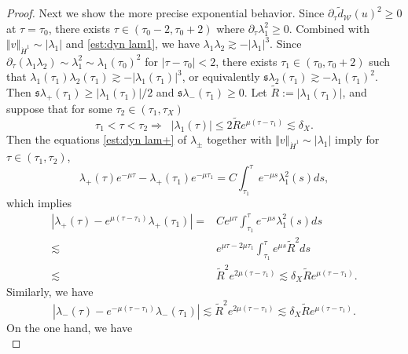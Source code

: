 \documentclass[reqno, 11pt]{amsart}
\numberwithin{equation}{section}
\theoremstyle{plain}
\theoremstyle{definition}
\numberwithin{equation}{section}
\numberwithin{theorem}{section}
\numberwithin{equation}{section}
\numberwithin{equation}{section}
\numberwithin{theorem}{section}
\begin{document}
\begin{proof}
		Next we show the more precise exponential behavior. Since $\partial_{\tau}\widetilde{d}_{\mathcal{W}}(u)^2 \geq0$ at $\tau=\tau_0$, there exists $\tau\in(\tau_0-2,\tau_0+2)$ where $\partial_{\tau}\lambda_{1}^2 \geq0$. Combined with $\Vert v \Vert_{\dot H^1}\sim |\lambda_{1}|$ and \eqref{est:dyn lam1}, we have $\lambda_{1}\lambda_{2}\gtrsim -|\lambda_{1}|^3$. Since $\partial_{\tau}(\lambda_{1}\lambda_{2})\sim \lambda_{1}^2\sim \lambda_{1}(\tau_{0})^2$ for $|\tau-\tau_{0}|<2$, there exists $\tau_{1}\in(\tau_{0},\tau_{0}+2)$ such that $\lambda_{1}(\tau_1)\lambda_{2}(\tau_1)\gtrsim -|\lambda_{1}(\tau_1)|^3$, or equivalently $\mathfrak{s}\lambda_{2}(\tau_1)\gtrsim-\lambda_{1}(\tau_{1})^2$. Then $\mathfrak{s}\lambda_+(\tau_{1})\geq |\lambda_{1}(\tau_{1})|/2$ and $\mathfrak{s}\lambda_-(\tau_{1})\geq 0$. Let $\widetilde{R}:=|\lambda_{1}(\tau_1)|$, and suppose that for some $\tau_{2}\in(\tau_{1},\tau_{X})$
		\begin{equation*}
		\tau_{1}<\tau<\tau_{2} \Longrightarrow\;\;|\lambda_{1}(\tau)|\leq 2\widetilde{R}e^{\mu(\tau-\tau_{1})} \lesssim \delta_{X}.
		\end{equation*}
		Then the equations \eqref{est:dyn lam+} of $\lambda_{\pm}$ together with $\Vert v \Vert_{\dot H^1}\sim |\lambda_{1}|$ imply for $\tau\in(\tau_1,\tau_2)$,
		\begin{equation}\label{equ:dyn elam+}
		\lambda_{+}(\tau)e^{-\mu\tau}-\lambda_{+}(\tau_1)e^{-\mu\tau_{1}}=C\int_{\tau_1}^{\tau}e^{-\mu s}\lambda_1^2(s)ds,
		\end{equation}
		which implies
		\begin{equation*}
		\begin{aligned}
		|\lambda_{+}(\tau)-e^{\mu(\tau-\tau_{1})} \lambda_{+}(\tau_{1})|=&Ce^{\mu\tau} \int_{\tau_1}^{\tau} e^{-\mu s}\lambda_1^2(s)ds\\\lesssim&e^{\mu\tau-2\mu\tau_{1}}\int_{\tau_1}^{\tau} e^{\mu s}\widetilde{R}^2ds \\\lesssim&\widetilde{R}^2 e^{2\mu(\tau-\tau_{1})} \lesssim \delta_{X}\widetilde{R}e^{\mu(\tau-\tau_{1})}.
		\end{aligned}
		\end{equation*}
		Similarly, we have
		\begin{equation*}
		|\lambda_{-}(\tau)-e^{-\mu(\tau-\tau_{1})} \lambda_{-}(\tau_{1})| \lesssim \widetilde{R}^2e^{2\mu(\tau-\tau_{1})} \lesssim \delta_{X}\widetilde{R}e^{\mu(\tau-\tau_{1})}.
		\end{equation*}
		On the one hand, we have 
		\begin{equation*}

\end{equation*}
\end{proof}
\end{document}
